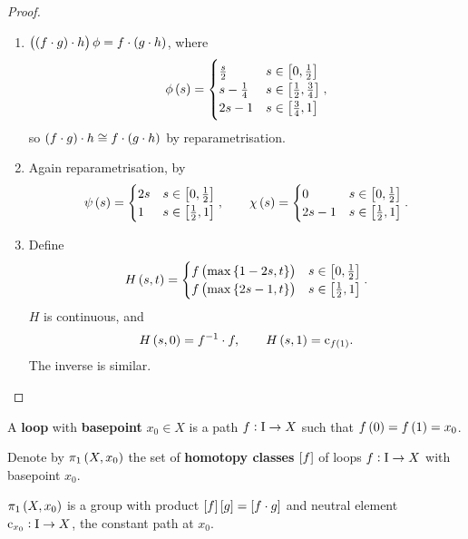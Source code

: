 \begin{proof}
\hfill
\begin{enumerate}
\item $ \br{\br{f \cdot g} \cdot h}\phi = f \cdot \br{g \cdot h} $, where
$$ \phi\br{s} =
\begin{cases}
\tfrac{s}{2} & s \in \sbr{0, \tfrac{1}{2}} \\
s - \tfrac{1}{4} & s \in \sbr{\tfrac{1}{2}, \tfrac{3}{4}} \\
2s - 1 & s \in \sbr{\tfrac{3}{4}, 1}
\end{cases},
$$
so $ \br{f \cdot g} \cdot h \cong f \cdot \br{g \cdot h} $ by reparametrisation.
\item Again reparametrisation, by
$$ \psi\br{s} =
\begin{cases}
2s & s \in \sbr{0, \tfrac{1}{2}} \\
1 & s \in \sbr{\tfrac{1}{2}, 1}
\end{cases},
\qquad \chi\br{s} =
\begin{cases}
0 & s \in \sbr{0, \tfrac{1}{2}} \\
2s - 1 & s \in \sbr{\tfrac{1}{2}, 1}
\end{cases}.
$$
\item Define
$$ H\br{s, t} =
\begin{cases}
f\br{\max\cbr{1 - 2s, t}} & s \in \sbr{0, \tfrac{1}{2}} \\
f\br{\max\cbr{2s - 1, t}} & s \in \sbr{\tfrac{1}{2}, 1}
\end{cases}.
$$
$ H $ is continuous, and
$$ H\br{s, 0} = f^{-1} \cdot f, \qquad H\br{s, 1} = \c_{f\br{1}}. $$
The inverse is similar.
\end{enumerate}
\end{proof}

\begin{definition*}
A \textbf{loop} with \textbf{basepoint} $ x_0 \in X $ is a path $ f : \mathrm{I} \to X $ such that $ f\br{0} = f\br{1} = x_0 $.
\end{definition*}

\begin{definition*}
Denote by $ \pi_1\br{X, x_0} $ the set of \textbf{homotopy classes} $ \sbr{f} $ of loops $ f : \mathrm{I} \to X $ with basepoint $ x_0 $.
\end{definition*}

\begin{proposition}
$ \pi_1\br{X, x_0} $ is a group with product $ \sbr{f}\sbr{g} = \sbr{f \cdot g} $ and neutral element $ \mathrm{c}_{x_0} : \mathrm{I} \to X $, the constant path at $ x_0 $.
\end{proposition}


